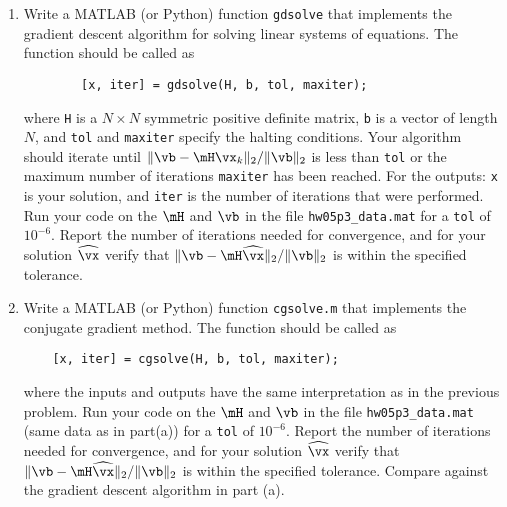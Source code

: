 \documentclass[11pt]{article}
\begin{document}
\begin{enumerate}
\begin{enumerate}
	\item Write a MATLAB (or Python) function \texttt{gdsolve} that implements the gradient descent algorithm for solving linear systems of equations.  The function should be called as
	\begin{verbatim}
		[x, iter] = gdsolve(H, b, tol, maxiter);
	\end{verbatim}
	where \texttt{H} is a $N\times N$ symmetric positive definite matrix, \texttt{b} is a vector of length $N$, and \texttt{tol} and 		\texttt{maxiter} specify the halting conditions.  Your algorithm should iterate until $\|\vb - \mH \vx_k\|_2/\|\vb\|_2$ is less than \texttt{tol} or the maximum number of iterations \texttt{maxiter} has been reached.  For the outputs: \texttt{x} is your solution, and \texttt{iter} is the number of iterations that were performed.  Run your code on the $\mH$ and $\vb$ in the file \texttt{hw05p3\_data.mat} for a \texttt{tol} of $10^{-6}$.  Report the number of iterations needed for convergence, and for your solution $\widehat\vx$ verify that $\|\vb - \mH \widehat{\vx}\|_2/\|\vb\|_2$ is within the specified tolerance.
	
	\item Write a MATLAB (or Python) function \texttt{cgsolve.m} that implements the conjugate gradient method.  The function should be called as
\begin{verbatim}
	[x, iter] = cgsolve(H, b, tol, maxiter);
\end{verbatim}
where the inputs and outputs have the same interpretation as in the previous problem.  Run your code on the $\mH$ and $\vb$ in the file \texttt{hw05p3\_data.mat} (same data as in part(a)) for a \texttt{tol} of $10^{-6}$.  Report the number of iterations needed for convergence, and for your solution $\widehat\vx$ verify that $\|\vb - \mH \widehat{\vx}\|_2/\|\vb\|_2$ is within the specified tolerance.  Compare against the gradient descent algorithm in part (a).
	
\end{enumerate}


\end{enumerate}
\end{document}
